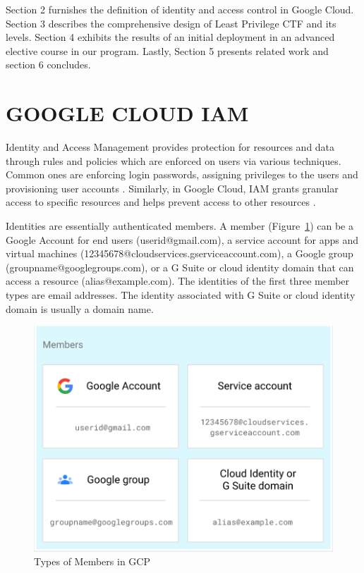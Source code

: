 \documentclass[a4paper,twoside]{article}
\begin{document}
Section 2 furnishes the definition of identity and access control in Google Cloud. Section 3 describes the comprehensive design of Least Privilege CTF and its levels. Section 4 exhibits the results of an initial deployment in an advanced elective course in our program. Lastly, Section 5 presents related work and section 6 concludes.


\section{\uppercase{Google Cloud IAM}}
\label{sec:gcpiam}

\noindent Identity and Access Management provides protection for resources and data through rules and policies which are enforced on users via various techniques. Common ones are enforcing login passwords, assigning privileges to the users and provisioning user accounts \cite{AlmullaSameeraAbdulrahmanandYeun2010}.
Similarly, in Google Cloud, IAM grants granular access to specific resources and helps prevent access to other resources \cite{Googlecloudiam}.

Identities are essentially authenticated members. A member (Figure~\ref{fig:mem}) can be a Google Account for end users (userid@gmail.com), a service account for apps and virtual machines (12345678@cloudservices.gserviceaccount.com), a Google group (groupname@googlegroups.com), or a G Suite or cloud identity domain that can access a resource (alias@example.com). The identities of the first three member types are email addresses. The identity associated with G Suite or cloud identity domain is usually a domain name.
\begin{figure}[h]
  \centering
  \includegraphics[width=\linewidth]{pic/mem}
  \caption {Types of Members in GCP}
  \label{fig:mem}
\end{figure}
\end{document}
